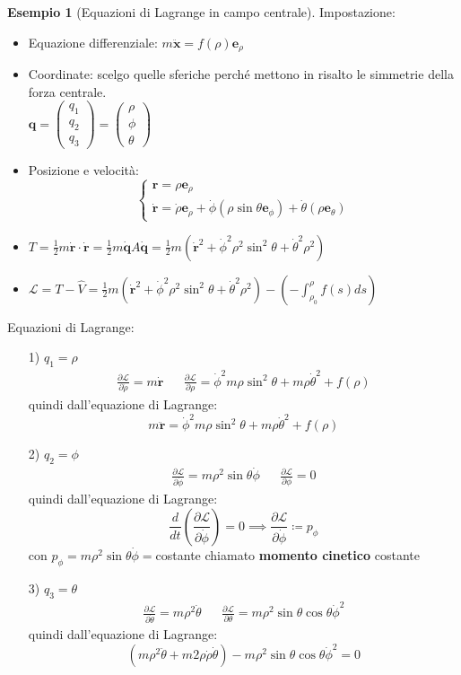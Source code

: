 \documentclass[a4paper,10pt]{article}
\theoremstyle{definition}
\newcommand{\bv}{\boldsymbol} %
\newcommand{\cvv}[3]{\begin{pmatrix} #1 \\ #2 \\ #3 \end{pmatrix}} %
\theoremstyle{indentdefinition}
\theoremstyle{indenttheorem}
\theoremstyle{myremark}
\newtheorem{example*}{Esempio}
\theoremstyle{indentgeneral}
\begin{document}
\begin{example*}[Equazioni di Lagrange in campo centrale] Impostazione:
    \begin{itemize}
        \item Equazione differenziale: $m\ddot{\bv{x}}=f(\rho)\bv{e}_\rho$
        \item Coordinate: scelgo quelle sferiche perché mettono in risalto le simmetrie della forza centrale. \\$\bv{q}=\cvv{q_1}{q_2}{q_3}=\cvv{\rho}{\phi}{\theta}$
        \item Posizione e velocità:
        $$\begin{cases}
            \bv{r}=\rho\bv{e}_\rho \\
            \dot{\bv{r}}=\dot{\rho}\bv{e}_\rho+\dot{\phi}(\rho\sin\theta\bv{e}_\phi)+\dot{\theta}(\rho\bv{e}_\theta)
        \end{cases}$$
        \item $T=\frac{1}{2}m\dot{\bv{r}}\cdot\dot{\bv{r}}=\frac{1}{2}m\dot{\bv{q}}A\dot{\bv{q}}=\frac{1}{2}m(\dot{\bv{r}}^2+\dot{\phi}^2\rho^2\sin^2\theta+\dot{\theta}^2\rho^2)$
        \item $\mathcal{L}=T-\hat{V}=\frac{1}{2}m(\dot{\bv{r}}^2+\dot{\phi}^2\rho^2\sin^2\theta+\dot{\theta}^2\rho^2)-\left(-\int_{\rho_0}^\rho f(s)ds\right)$
    \end{itemize}
    Equazioni di Lagrange:
    \begin{itemize}
        \item[1)] $q_1=\rho$
        \begin{align*}
            \frac{\partial \mathcal{L}}{\partial \dot{\rho}} = m\dot{\bv{r}} & &  \frac{\partial \mathcal{L}}{\partial {\rho}} = \dot{\phi}^2m\rho\sin^2\theta+m\rho\dot{\theta}^2+f(\rho)
        \end{align*}
        quindi dall'equazione di Lagrange:
        $$m\ddot{\bv{r}}=\dot{\phi}^2m\rho\sin^2\theta+m\rho\dot{\theta}^2+f(\rho)$$
        \item[2)] $q_2=\phi$
        \begin{align*}
            \frac{\partial \mathcal{L}}{\partial \dot{\phi}} = m\rho^2\sin\theta\dot{\phi} & &  \frac{\partial \mathcal{L}}{\partial {\phi}} = 0
        \end{align*}
        quindi dall'equazione di Lagrange: 
        $$\frac{d}{dt}\left( \frac{\partial \mathcal{L}}{\partial \dot{\phi}}\right)=0\implies \frac{\partial \mathcal{L}}{\partial \dot{\phi}}\coloneqq p_\phi$$
        con $p_\phi= m\rho^2\sin\theta\dot{\phi}=$costante chiamato \textbf{momento cinetico} costante

        \item[3)] $q_3=\theta$
        \begin{align*}
            \frac{\partial \mathcal{L}}{\partial \dot{\theta}} = m\rho^2\dot{\theta} & &  \frac{\partial \mathcal{L}}{\partial {\theta}} = m\rho^2\sin\theta\cos\theta\dot{\phi}^2
        \end{align*}
        quindi dall'equazione di Lagrange:
        $$(m\rho^2\ddot{\theta}+m2\rho\dot{\rho}\dot{\theta})-m\rho^2\sin\theta\cos\theta\dot{\phi}^2=0$$
    \end{itemize}
\end{example*}
\end{document}
